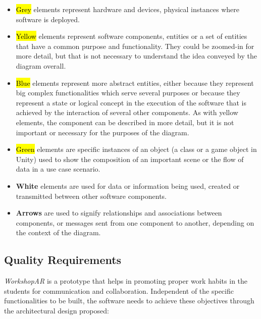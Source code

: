\begin{itemize}
    \item {}\hl{Grey} elements represent hardware and devices, physical instances where software is deployed.
    \item {}\hl{Yellow} elements represent software components, entities or a set of entities that have a common purpose and functionality. They could be
    zoomed-in for more detail, but that is not necessary to understand the idea conveyed by the diagram overall.
    \item {}\hl{Blue} elements represent more abstract entities, either because they represent big complex functionalities which serve several purposes or
    because they represent a state or logical concept in the execution of the software that is achieved by the interaction of several other components. As with yellow
    elements, the component can be described in more detail, but it is not important or necessary for the purposes of the  diagram.
    \item {}\hl{Green} elements are specific instances of an object (a class or a game object in Unity) used to show the composition of an important scene
    or the flow of data in a use case scenario.
    \item \textbf{White} elements are used for data or information being used, created or transmitted between other software components.
    \item \textbf{Arrows} are used to signify relationships and associations between components, or messages sent from one component to another, depending on the context
    of the diagram.
\end{itemize}

\subsection{Quality Requirements \label{sec:4-3-1}}

\emph{WorkshopAR} is a prototype that helps in promoting proper work habits in the students for communication and collaboration. Independent of the specific functionalities
to be built, the software needs to achieve these objectives through the architectural design proposed:

